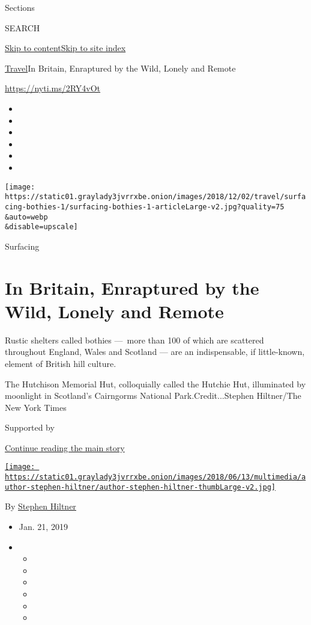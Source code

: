 Sections

SEARCH

\protect\hyperlink{site-content}{Skip to
content}\protect\hyperlink{site-index}{Skip to site index}

\href{/section/travel}{Travel}\textbar{}In Britain, Enraptured by the
Wild, Lonely and Remote

\url{https://nyti.ms/2RY4vOt}

\begin{itemize}
\item
\item
\item
\item
\item
\item
\end{itemize}

\texttt{[image: https://static01.graylady3jvrrxbe.onion/images/2018/12/02/travel/surfacing-bothies-1/surfacing-bothies-1-articleLarge-v2.jpg?quality=75\\\&auto=webp\\\&disable=upscale]}

Surfacing

\hypertarget{in-britain-enraptured-by-the-wild-lonely-and-remote}{%
\section{In Britain, Enraptured by the Wild, Lonely and
Remote}\label{in-britain-enraptured-by-the-wild-lonely-and-remote}}

Rustic shelters called bothies ---~more than 100 of which are scattered
throughout England, Wales and Scotland --- are an indispensable, if
little-known, element of British hill culture.

The Hutchison Memorial Hut, colloquially called the Hutchie Hut,
illuminated by moonlight in Scotland's Cairngorms National
Park.Credit...Stephen Hiltner/The New York Times

Supported by

\protect\hyperlink{after-sponsor}{Continue reading the main story}

\href{https://www.nytimes3xbfgragh.onion/by/stephen-hiltner}{\texttt{[image: https://static01.graylady3jvrrxbe.onion/images/2018/06/13/multimedia/author-stephen-hiltner/author-stephen-hiltner-thumbLarge-v2.jpg]}}

By \href{https://www.nytimes3xbfgragh.onion/by/stephen-hiltner}{Stephen
Hiltner}

\begin{itemize}
\item
  Jan. 21, 2019
\item
  \begin{itemize}
  \item
  \item
  \item
  \item
  \item
  \item
  \end{itemize}
\end{itemize}

